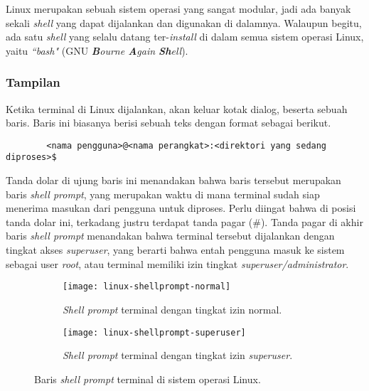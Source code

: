 Linux merupakan sebuah sistem operasi yang sangat modular, jadi ada banyak sekali \textit{shell} yang dapat dijalankan dan digunakan di dalamnya. Walaupun begitu, ada satu \textit{shell} yang selalu datang ter-\textit{install} di dalam semua sistem operasi Linux, yaitu \textit{``bash"} (GNU \textit{\textbf{B}ourne \textbf{A}gain \textbf{Sh}ell}).\cite{matthew:2007:beginninglinuxprogramming}

\subsubsection{Tampilan}
\label{sec:commandline-linux-appearance}

Ketika terminal di Linux dijalankan, akan keluar kotak dialog, beserta sebuah baris. Baris ini biasanya berisi sebuah teks dengan format sebagai berikut.

\begin{verbatim}
        <nama pengguna>@<nama perangkat>:<direktori yang sedang diproses>$
\end{verbatim}

Tanda dolar di ujung baris ini menandakan bahwa baris tersebut merupakan baris \textit{shell prompt}, yang merupakan waktu di mana terminal sudah siap menerima masukan dari pengguna untuk diproses. Perlu diingat bahwa di posisi tanda dolar ini, terkadang justru terdapat tanda pagar (\#). Tanda pagar di akhir baris \textit{shell prompt} menandakan bahwa terminal tersebut dijalankan dengan tingkat akses \textit{superuser}, yang berarti bahwa entah pengguna masuk ke sistem sebagai user \textit{root}, atau terminal memiliki izin tingkat \textit{superuser/administrator}.\cite{shottsjr:2019:linuxcommandline}

\begin{figure}[ht]
    \begin{subfigure}[b]{0.475\linewidth}
		\centering
		\texttt{[image: linux-shellprompt-normal]}
		\caption{\textit{Shell prompt} terminal dengan tingkat izin \mbox{normal}.}
		\label{fig:shellprompt-linux-normal}
	\end{subfigure}
	\hfill
    \begin{subfigure}[b]{0.475\linewidth}
		\centering
		\texttt{[image: linux-shellprompt-superuser]}
		\caption{\textit{Shell prompt} terminal dengan tingkat izin \textit{\mbox{superuser}}.}
		\label{fig:shellprompt-linux-superuser}
	\end{subfigure}
    \caption{Baris \textit{shell prompt} terminal di sistem operasi Linux.}
	\label{fig:commandline-shellprompt-linux}
\end{figure}

